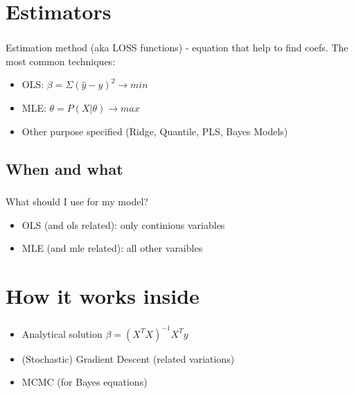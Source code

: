 \documentclass[t, 11pt]{beamer}
\begin{document}
\section{Estimators}

\begin{frame}
	\frametitle{\insertsection} 
	\framesubtitle{\insertsubsection} 
	Estimation method (aka LOSS functions) - equation that help to find coefs. The most common techniques:
	\begin{itemize}
		\item OLS: $\beta = \Sigma(\hat{y} - y)^2 \rightarrow min$
		\item MLE: $\theta = P(X|\theta) \rightarrow max$
		\item Other purpose specified (Ridge, Quantile, PLS, Bayes Models)
		\end{itemize}
	
\end{frame}	



\subsection{When and what}

\begin{frame}
	\frametitle{\insertsection} 
	\framesubtitle{\insertsubsection} 
	What should I use for my model?
	\begin{itemize}
		\item OLS (and ols related): only continious variables
		\item MLE (and mle related): all other varaibles 
	\end{itemize}
	
\end{frame}	

\section{How it works inside}
	
\begin{frame}
	\frametitle{\insertsection} 
	\framesubtitle{\insertsubsection} 
	
	\begin{itemize}
		\item Analytical solution $\beta = (X^TX)^{-1}X^Ty$
		\item (Stochastic) Gradient Descent (related variations)
		\item MCMC (for Bayes equations)
	\end{itemize}
	
	
\end{frame}	
\end{document}

